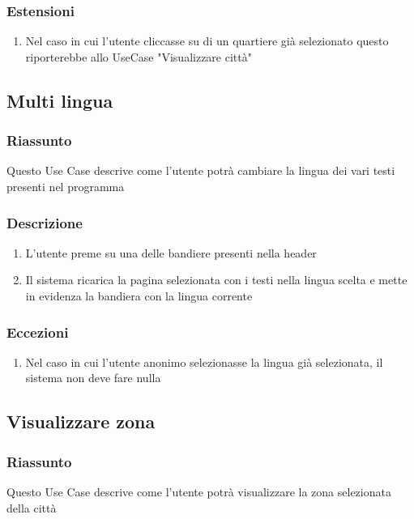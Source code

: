         \subsubsection{Estensioni}
            \begin{enumerate}
                \item Nel caso in cui l'utente cliccasse su di un quartiere già selezionato questo riporterebbe allo UseCase "Visualizzare città"
            \end{enumerate}
            
    \subsection{Multi lingua}
        \subsubsection{Riassunto}
            Questo Use Case descrive come l'utente potrà cambiare la lingua dei vari testi presenti nel programma
        \subsubsection{Descrizione}
            \begin{enumerate}
                \item L'utente preme su una delle bandiere presenti nella header
                \item Il sistema ricarica la pagina selezionata con i testi nella lingua scelta e mette in evidenza la bandiera con la lingua corrente
            \end{enumerate}
        \subsubsection{Eccezioni}
            \begin{enumerate}
                \item Nel caso in cui l'utente anonimo selezionasse la lingua già selezionata, il sistema non deve fare nulla
            \end{enumerate}

    \subsection{Visualizzare zona}
        \subsubsection{Riassunto}
            Questo Use Case descrive come l'utente potrà visualizzare la zona selezionata della città
